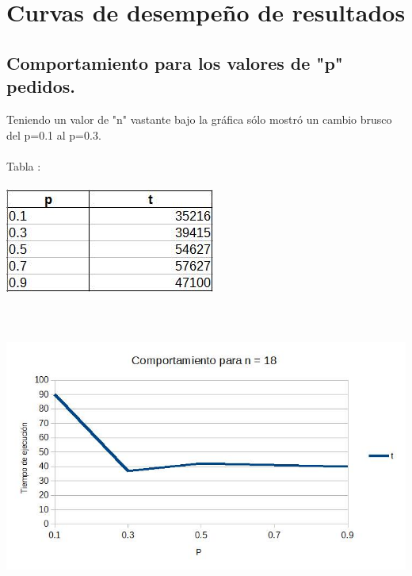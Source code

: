 \documentclass[12pt,letterpaper]{scrartcl}
\begin{document}
\newpage

\section{Curvas de desempeño de resultados}
\subsection{Comportamiento para los valores de "p" pedidos.}

Teniendo un valor de "n" vastante bajo la gráfica sólo mostró un cambio brusco del p=0.1 al p=0.3.
\\\\
Tabla :
\\\\
\includegraphics[scale=0.55]{3}
\\\\\\\\
\includegraphics[scale=0.55]{n}
\newpage
\end{document}
